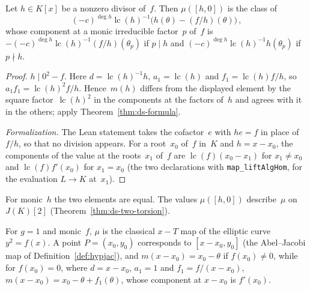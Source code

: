 \begin{corollary}
\label{cor:ds-torsion-values}
\leanok
{}
Let $h \in K[x]$ be a nonzero divisor of~$f$. Then $\mu([h, 0])$ is the class of
\[ (-c)^{\deg h}\operatorname{lc}(h)^{-1}\bigl(h(\theta) - (f/h)(\theta)\bigr)\,, \]
whose component at a monic irreducible factor~$p$ of~$f$ is
$-(-c)^{\deg h}\operatorname{lc}(h)^{-1}(f/h)(\theta_p)$ if $p \mid h$ and
$(-c)^{\deg h}\operatorname{lc}(h)^{-1}h(\theta_p)$ if $p \nmid h$.
\end{corollary}

\begin{proof}
\leanok
{}
$h \mid 0^2 - f$. Here $d = \operatorname{lc}(h)^{-1}h$, $a_1 = \operatorname{lc}(h)$ and
$f_1 = \operatorname{lc}(h)f/h$, so $a_1f_1 = \operatorname{lc}(h)^2f/h$. Hence~$m(h)$ differs from
the displayed element by the square factor~$\operatorname{lc}(h)^2$ in the components at the
factors of~$h$ and agrees with it in the others; apply Theorem~\ref{thm:ds-formula}.

\emph{Formalization.} The Lean statement takes the cofactor~$e$ with $he = f$ in place of~$f/h$,
so that no division appears. For a root~$x_0$ of~$f$ in~$K$ and $h = x - x_0$, the components of
the value at the roots~$x_1$ of~$f$ are $\operatorname{lc}(f)(x_0 - x_1)$ for $x_1 \ne x_0$ and
$\operatorname{lc}(f)f'(x_0)$ for $x_1 = x_0$ (the two declarations with
\texttt{map\_liftAlgHom}, for the evaluation $L \to K$ at~$x_1$).
\end{proof}

For monic~$h$ the two elements are equal. The values $\mu([h, 0])$ describe~$\mu$ on~$J(K)[2]$
(Theorem~\ref{thm:ds-two-torsion}).

\begin{remark}
\label{rem:ds-ec}
For $g = 1$ and monic~$f$, $\mu$ is the classical $x - T$ map of the elliptic curve
$y^2 = f(x)$. A point $P = (x_0, y_0)$ corresponds to $[x - x_0, y_0]$ (the Abel--Jacobi map of
Definition~\ref{def:hypjac}), and $m(x - x_0) = x_0 - \theta$ if $f(x_0) \ne 0$, while for
$f(x_0) = 0$, where $d = x - x_0$, $a_1 = 1$ and $f_1 = f/(x - x_0)$,
$m(x - x_0) = x_0 - \theta + f_1(\theta)$, whose component at $x - x_0$ is $f'(x_0)$.
\end{remark}

